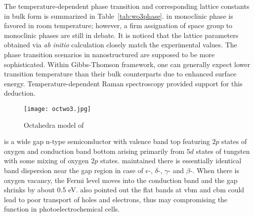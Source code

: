 The temperature-dependent phase transition and corresponding lattice constants in bulk form is summarized in Table~\ref{tab:wo3phase}.\cite{Zheng2011}  in monoclinic phase is favored in room temperature; however, a firm assignation of space group to monoclinic phases are still in debate.\cite{Chatten2005} It is noticed that the lattice parameters obtained via \emph{ab initio} calculation closely match the experimental values.\cite{Migas2010a} The phase transition scenarios in nanostructured  are supposed to be more sophisticated. Within Gibbs-Thomson framework, one can generally expect lower transition temperature than their bulk counterparts due to enhanced surface energy. Temperature-dependent Raman spectroscopy provided support for this deduction.\cite{Boulova2002}
\begin{figure}[htb]
\centering
\texttt{[image: octwo3.jpg]}
\caption[Octahedra model of ]{Octahedra model of }
\label{fig:wo3oct}
\end{figure}

 is a wide gap n-type semiconductor with valence band top featuring $2p$ states of oxygen and conduction band bottom arising primarily from $5d$ states of tungsten with some mixing of oxygen $2p$ states.\cite{Gillet2004} \citeauthor{Migas2010a} maintained there is essentially identical band dispersion near the gap region in case of $\epsilon$-, $\delta$-, $\gamma$- and $\beta$-.\cite{Migas2010a} When there is oxygen vacancy, the Fermi level moves into the conduction band and the gap shrinks by about 0.5 eV. \citeauthor{Migas2010a} also pointed out the flat bands at \gls{vbm} and \gls{cbm} could lead to poor transport of holes and electrons, thus may compromising the function in photoelectrochemical cells.

